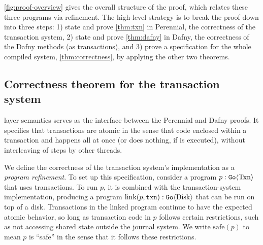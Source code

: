 \autoref{fig:proof-overview} gives the overall structure of the proof, which
relates these three programs via refinement. The high-level strategy is to break the proof down
into three steps: 1) state and prove \autoref{thm:txn} in Perennial, the correctness
of the transaction system, 2) state and prove \autoref{thm:dafny} in Dafny, the
correctness of the Dafny methods (as transactions), and 3) prove a specification
for the whole compiled system, \autoref{thm:correctness}, by applying the other
two theorems.


\subsection{Correctness theorem for the transaction system}
\label{sec:proof:txn}

 layer semantics serves as the interface between the Perennial and Dafny
proofs.  It specifies that transactions are atomic in the sense that code
enclosed within a transaction  and  happens all at once (or
does nothing, if  is executed), without interleaving of steps by other
threads.

We define the correctness of the transaction system's implementation as a
\emph{program refinement}.
To set up this specification, consider a program $p : \mathtt{Go}\langle \mathrm{Txn} \rangle$ that
uses transactions.
To run $p$, it is combined with the transaction-system implementation, producing
a program $\mathrm{link}(p, \texttt{txn}) : \mathtt{Go}\langle \mathrm{Disk} \rangle$ that can be run on
top of a disk.
Transactions in the linked program continue to have the expected atomic
behavior, so long as transaction code in $p$ follows certain restrictions, such
as not accessing shared state outside the journal system.  We write
$\mathrm{safe}(p)$ to mean $p$ is ``safe'' in the sense that it follows these restrictions.


